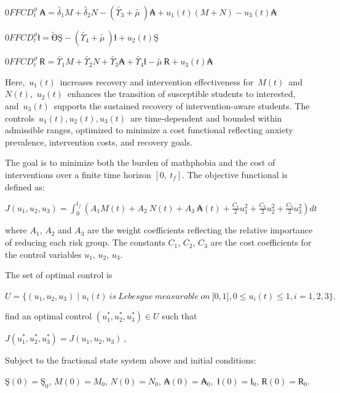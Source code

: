 \(0FFCD_{t}^{\vartheta}\ ₳ = \widetilde{\delta_{1}}M + \widetilde{\delta_{2}}N - \left( \widetilde{\Upsilon_{3}} + \widetilde{\mu\ } \right)₳ + u_{1}(t)(M + N) - u_{3}(t)₳\)

\(0FFCD_{t}^{\vartheta}ƚ = \widetilde{Ө}Ş - \left( \widetilde{\Upsilon_{4}} + \widetilde{\mu\ } \right)ƚ + u_{2}(t)Ş\)

\(0FFCD_{t}^{\vartheta}\ Ɍ = \widetilde{\Upsilon_{1}}M + \widetilde{\Upsilon_{2}}N + \widetilde{\Upsilon_{3}}₳ + \widetilde{\Upsilon_{4}}ƚ - \widetilde{\mu\ }Ɍ + u_{3}(t)₳\)

Here,~\(u_{1}(t)\)~increases recovery and intervention effectiveness for~\(M(t)\)~and~\(N(t)\),~\(u_{2}(t)\)~enhances the transition of susceptible students to interested, and~\(u_{3}(t)\)~supports the sustained recovery of intervention-aware students. The controls~\(u_{1}(t),u_{2}(t),u_{3}(t)\)~are time-dependent and bounded within admissible ranges, optimized to minimize a cost functional reflecting anxiety prevalence, intervention costs, and recovery goals.

The goal is to minimize both the burden of mathphobia and the cost of interventions over a finite time horizon \(\left\lbrack 0,\ t_{f} \right\rbrack.\) The objective functional is defined as:

\(J\left( u_{1},u_{2},u_{3} \right) = \int_{0}^{t_{f}}{}\left( A_{1}M(t) + A_{2}\ N(t) + A_{3}\ ₳(t) + \frac{C_{1}}{2}u_{1}^{2} + \frac{C_{2}}{2}u_{2}^{2} + \frac{C_{3}}{2}u_{3}^{2} \right)dt\)

where \(A_{1}\), \(A_{2}\) and \(A_{3}\) are the weight coefficients reflecting the relative importance of reducing each risk group. The constants \(C_{1}\), \(C_{2}\), \(C_{3}\) are the cost coefficients for the control variables \(u_{1}\), \(u_{2}\), \(u_{3}\).

The set of optimal control is

\(U = \{\left( u_{1},u_{2},u_{3} \right) \mid u_{i}(t)\ is\ Lebesgue\ measurable\ on\ \lbrack 0,1\rbrack,0 \leq u_{i}(t) \leq 1,i = 1,2,3\}.\)

find an optimal control \((u_{1}^{*},u_{2}^{*},u_{3}^{*}) \in U\) such that

\(J\left( u_{1}^{*},u_{2}^{*},u_{3}^{*} \right) = J\left( u_{1},u_{2},u_{3} \right)\ ,\)

Subject to the fractional state system above and initial conditions:

\(Ş(0) = Ş_{0}\), \(M(0) = M_{0}\), \(N(0) = N_{0}\), \(₳(0) = ₳_{0},\) \(ƚ(0) = ƚ_{0}\), \(Ɍ(0) = Ɍ_{0}\)\emph{.}

